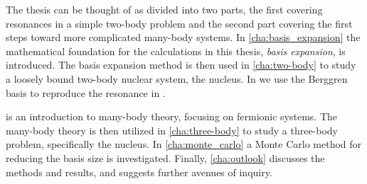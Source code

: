 \documentclass[../main/report.tex]{subfiles}
\begin{document}
The thesis can be thought of as divided into two parts, the first covering resonances in a simple two-body problem and the second part covering the first steps toward more complicated many-body systems. 
In \cref{cha:basis_expansion} the mathematical foundation for the calculations in this thesis, \emph{basis expansion}, is introduced.
The basis expansion method is then used in \cref{cha:two-body} to study a loosely bound two-body nuclear system, the  nucleus.
In  we use the Berggren basis to reproduce the resonance in .

 is an introduction to many-body theory, focusing on fermionic systems. 
The many-body theory is then utilized in \cref{cha:three-body} 
to study a three-body problem, specifically the  nucleus.  
In \cref{cha:monte_carlo} a Monte Carlo method for reducing the basis size is investigated. 
Finally, \cref{cha:outlook} discusses the methods and results, and suggests further avenues of inquiry.
\end{document}
